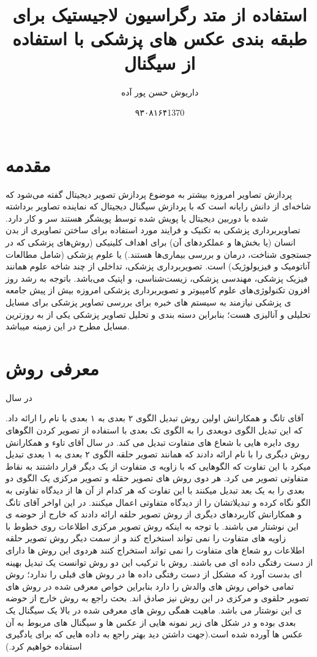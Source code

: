 \documentclass[10pt,a4paper]{article}
\begin{document}
\title{استفاده از متد رگراسیون لاجیستیک برای طبقه بندی عکس های پزشکی با استفاده از سیگنال }
\author{داریوش حسن پور آده}
\date{۹۳۰۸۱۶۴}
\maketitle
\null
\vfill
\newpage
\section{مقدمه}
پردازش تصاویر امروزه بیشتر به موضوع پردازش تصویر دیجیتال گفته می‌شود که شاخه‌ای از دانش رایانه است که با پردازش سیگنال دیجیتال که نماینده تصاویر برداشته شده با دوربین دیجیتال یا پویش شده توسط پویشگر هستند سر و کار دارد. تصاویربرداری پزشکی به تکنیک و فرایند مورد استفاده برای ساختن تصاویری از بدن انسان (یا بخش‌ها و عملکردهای آن) برای اهداف کلینیکی (روش‌های پزشکی که در جستجوی شناخت، درمان و بررسی بیماری‌ها هستند.) یا علوم پزشکی (شامل مطالعات آناتومیک و فیزیولوژیک) است. تصویربرداری پزشکی، تداخلی از چند شاخه علوم همانند فیزیک 
پزشکی، مهندسی پزشکی، زیست‌شناسی، و اپتیک می‌باشد.
باتوجه به رشد روز افزون تکنولوژی‌های علوم کامپیوتر و تصویربرداری پزشکی امروزه بیش‌ از‌ پیش جامعه ی پزشکی نیازمند به سیستم های خبره برای بررسی تصاویر پزشکی برای مسایل تحلیلی و آنالیزی هست؛ بنابراین دسته بندی و تحلیل تصاویر پزشکی یکی از به روزترین مسایل مطرح در این زمینه میباشد.
\tableofcontents
\newpage
\section{معرفی روش }
در سال
\date{1370}
آقای تانگ و همکارانش
\cite{RP}
 اولین روش تبدیل الگوی ۲ بعدی به ۱ بعدی با نام  را ارائه داد.
که این تبدیل الگوی دوبعدی را به الگوی تک بعدی با استفاده از تصویر کردن الگوهای روی دایره هایی با شعاع های متفاوت تبدیل می کند.
در سال  آقای تاوء و همکارانش
\cite{CP}
 روش دیگری را با نام  
ارائه دادند که همانند تصویر حلقه  الگوی ۲ بعدی به ۱ بعدی تبدیل میکرد با این تفاوت که الگوهایی که با زاویه ی متفاوت از یک دیگر قرار داشتند به نقاط متفاوتی تصویر می کرد.
هر دوی روش های تصویر حقله و تصویر مرکزی یک الگوی دو بعدی را به یک بعد تبدیل میکنند با این تفاوت که هر کدام از آن ها از دیدگاه تفاوتی به الگو نگاه کرده و تبدیلاتشان را از دیدگاه متفاوتی اعمال میکنند.
در این اواخر آقای تانگ و همکارانش 
\cite{WRP, FRP}
کاربردهای دیگری از روش تصویر حلقه ارائه دادند که خارج از حوضه ی این نوشتار می باشند.
با توجه به اینکه روش تصویر مرکزی اطلاعات روی خطوط با زاویه های متفاوت را نمی تواند استخراج کند و از سمت دیگر روش تصویر حلقه اطلاعات رو شعاع های متفاوت را نمی تواند استخراج کنند هردوی این روش ها دارای از دست رفتگی داده ای می باشند. روش
با ترکیب این دو روش توانست یک تبدیل بهینه ای بدست آورد که مشکل از دست رفتگی داده ها در روش های قبلی را ندارد؛ روش
تمامی خواص روش های والدش را دارد بنابراین خواص معرفی شده در روش های تصویر حلقوی و مرکزی در این روش نیز صادق اند. بحث راجع به روش
خارج از حوضه ی این نوشتار می باشد.
ماهیت همگی روش های معرفی شده در بالا یک سیگنال یک بعدی بوده و در شکل های زیر نمونه هایی از عکس ها و سیگنال های
مربوط به آن عکس ها آورده شده است.(جهت داشتن دید بهتر راجع به داده هایی که برای یادگیری استفاده خواهیم کرد.)
\end{document}
